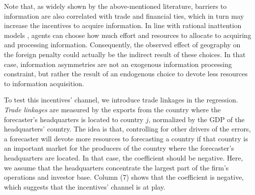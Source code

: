 Note that, as widely shown by the above-mentioned literature, barriers to information are also correlated with trade and financial ties, which in turn may increase the incentives to acquire information. In line with rational inattention models \citep{Sims2003}, agents can choose how much effort and resources to allocate to acquiring and processing information. Consequently, the observed effect of geography on the foreign penalty could actually be the indirect result of these choices. In that case, information asymmetries are not an exogenous information processing constraint, but rather the result of an endogenous choice to devote less resources to information acquisition.






To test this incentives' channel, we introduce trade linkages in the regression. \textit{Trade linkages} are measured by the exports from the country where the forecaster's headquarters is located to country $j$, normalized by the GDP of the headquarters' country. The idea is that, controlling for other drivers of the errors, a forecaster will devote more resources to forecasting a country if that country is an important market for the producers of the country where the forecaster's headquarters are located. In that case, the coefficient should be negative. Here, we assume that the headquarters concentrate the largest part of the firm's operations and investor base. Column (7) shows that the coefficient is negative, which suggests that the incentives' channel is at play.

